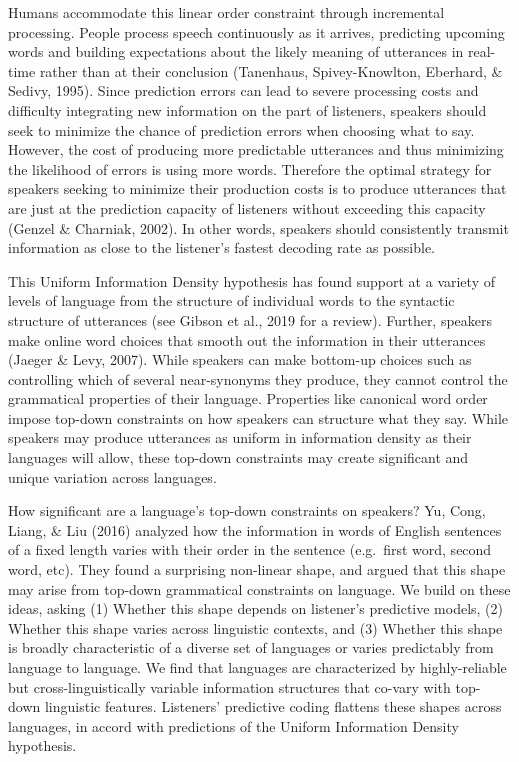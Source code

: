 \documentclass[10pt, letterpaper]{article}
\begin{document}
Humans accommodate this linear order constraint through incremental
processing. People process speech continuously as it arrives, predicting
upcoming words and building expectations about the likely meaning of
utterances in real-time rather than at their conclusion (Tanenhaus,
Spivey-Knowlton, Eberhard, \& Sedivy, 1995). Since prediction errors can
lead to severe processing costs and difficulty integrating new
information on the part of listeners, speakers should seek to minimize
the chance of prediction errors when choosing what to say. However, the
cost of producing more predictable utterances and thus minimizing the
likelihood of errors is using more words. Therefore the optimal strategy
for speakers seeking to minimize their production costs is to produce
utterances that are just at the prediction capacity of listeners without
exceeding this capacity (Genzel \& Charniak, 2002). In other words,
speakers should consistently transmit information as close to the
listener's fastest decoding rate as possible.

This Uniform Information Density hypothesis has found support at a
variety of levels of language from the structure of individual words to
the syntactic structure of utterances (see Gibson et al., 2019 for a
review). Further, speakers make online word choices that smooth out the
information in their utterances (Jaeger \& Levy, 2007). While speakers
can make bottom-up choices such as controlling which of several
near-synonyms they produce, they cannot control the grammatical
properties of their language. Properties like canonical word order
impose top-down constraints on how speakers can structure what they say.
While speakers may produce utterances as uniform in information density
as their languages will allow, these top-down constraints may create
significant and unique variation across languages.

How significant are a language's top-down constraints on speakers? Yu,
Cong, Liang, \& Liu (2016) analyzed how the information in words of
English sentences of a fixed length varies with their order in the
sentence (e.g.~first word, second word, etc). They found a surprising
non-linear shape, and argued that this shape may arise from top-down
grammatical constraints on language. We build on these ideas, asking (1)
Whether this shape depends on listener's predictive models, (2) Whether
this shape varies across linguistic contexts, and (3) Whether this shape
is broadly characteristic of a diverse set of languages or varies
predictably from language to language. We find that languages are
characterized by highly-reliable but cross-linguistically variable
information structures that co-vary with top-down linguistic features.
Listeners' predictive coding flattens these shapes across languages, in
accord with predictions of the Uniform Information Density hypothesis.
\end{document}

